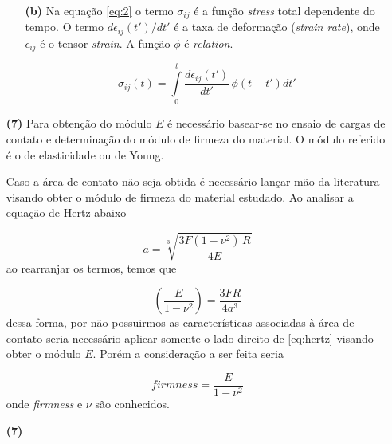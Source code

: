 \documentclass[a4paper, 12pt, brazilian]{article}
\begin{document}
\begin{itemize}
\begin{itemize}
			
			\item[\textbf{(b)}] Na equação \eqref{eq:2} o termo $\sigma_{ij}$ é a função \textit{stress} total dependente do tempo. O termo $d\epsilon_{ij}(t')/dt'$ é a taxa de deformação (\textit{strain rate}), onde $\epsilon_{ij}$ é o tensor \textit{strain}. A função $\phi$ é \textit{relation}.
			
			\begin{equation}
				\label{eq:2}
				\sigma_{ij}(t)=\int\limits_{0}^{t}\dfrac{d\epsilon_{ij}(t')}{dt'}\,\phi(t-t')dt'
			\end{equation}
		\end{itemize}
		
		\item[\textbf{(7)}] Para obtenção do módulo $E$ é necessário basear-se no ensaio de cargas de contato e determinação do módulo de firmeza do material. O módulo referido é o de elasticidade ou de Young. 
		
		Caso a área de contato não seja obtida é necessário lançar mão da literatura visando obter o módulo de firmeza do material estudado. Ao analisar a equação de Hertz abaixo
		
		\begin{equation}
			a=\sqrt[3]{\dfrac{3F(1-\nu^{2})\,R}{4E}}
		\end{equation}
		ao rearranjar os termos, temos que
		
		\begin{equation}
			\label{eq:hertz}
			\left(\dfrac{E}{1-\nu^{2}}\right)=\dfrac{3FR}{4a^{3}}
		\end{equation}
		dessa forma, por não possuirmos as características associadas à área de contato seria necessário aplicar somente o lado direito de \eqref{eq:hertz} visando obter o módulo $E$. Porém a consideração a ser feita seria
		
		\begin{equation}
			\textit{firmness}=\dfrac{E}{1-\nu^{2}}
		\end{equation}
		onde \textit{firmness} e $\nu$ são conhecidos.
	
		\item[\textbf{(7)}]	
	

\end{itemize}
\end{document}
